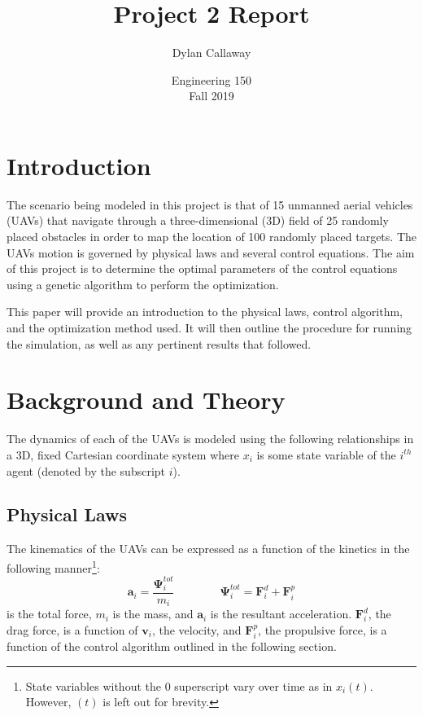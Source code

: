 \documentclass[a4paper,12pt]{report}
\begin{document}
\setlength{\abovedisplayskip}{6pt}
\setlength{\belowdisplayskip}{8pt}
\setlength{\abovedisplayshortskip}{2pt}
\setlength{\belowdisplayshortskip}{8pt}

\title{Project 2 Report}
\author{Dylan Callaway}
\date{Engineering 150 \\ Fall 2019}
\maketitle

\tableofcontents
\newpage
{}

\section{Introduction}
The scenario being modeled in this project is that of 15 unmanned aerial vehicles (UAVs) that navigate through a three-dimensional (3D) field of 25 randomly placed obstacles in order to map the location of 100 randomly placed targets. The UAVs motion is governed by physical laws and several control equations. The aim of this project is to determine the optimal parameters of the control equations using a genetic algorithm to perform the optimization.

This paper will provide an introduction to the physical laws, control algorithm, and the optimization method used. It will then outline the procedure for running the simulation, as well as any pertinent results that followed.


\section{Background and Theory}
The dynamics of each of the UAVs is modeled using the following relationships in a 3D, fixed Cartesian coordinate system where $x_i$ is some state variable of the $i^{th}$ agent (denoted by the subscript $i$).

\subsection{Physical Laws}
The kinematics of the UAVs can be expressed as a function of the kinetics in the following manner\footnote{State variables without the $0$ superscript vary over time as in $x_i(t)$. However, $(t)$ is left out for brevity.}:
$$\bm{a}_i = \frac{\bm{\Psi}^{tot}_i}{m_i} \qquad \qquad \bm{\Psi}^{tot}_i = \bm{F}^d_i +\bm{F}^p_i$$
is the total force, $m_i$ is the mass, and $\bm{a}_i$ is the resultant acceleration. $\bm{F}^d_i$, the drag force, is a function of $\bm{v}_i$, the velocity, and $\bm{F}^p_i$, the propulsive force, is a function of the control algorithm outlined in the following section.
 
\end{document}
